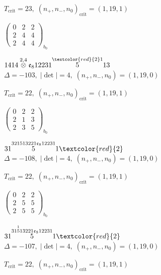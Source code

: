 \documentclass[10pt]{article}
\begin{document}
\hspace{1em}$T_{\text{crit}}=23,\; (n_+,n_-,n_0)_{\text{crit}}=(1,19,1)$

\hspace{2em}$\left(\begin{smallmatrix}0 & 2 & 2 \\ 2 & 4 & 4 \\ 2 & 4 & 4\end{smallmatrix}\right)_{\!b_0}$

\smallskip

$1414\overset{2,4}{\otimes}\mathfrak{e}_812231\overset{\textcolor{red}{2}1}{5}13$ \quad $\Delta=-103,\; |\det|=4,\; (n_+,n_-,n_0)=(1,19,0)$

\hspace{1em}$T_{\text{crit}}=22,\; (n_+,n_-,n_0)_{\text{crit}}=(1,19,1)$

\hspace{2em}$\left(\begin{smallmatrix}0 & 2 & 2 \\ 2 & 1 & 3 \\ 2 & 3 & 5\end{smallmatrix}\right)_{\!b_0}$

\smallskip

$31\overset{321513221\mathfrak{e}_812231}{5}1\textcolor{red}{2}$ \quad $\Delta=-108,\; |\det|=4,\; (n_+,n_-,n_0)=(1,19,0)$

\hspace{1em}$T_{\text{crit}}=22,\; (n_+,n_-,n_0)_{\text{crit}}=(1,19,1)$

\hspace{2em}$\left(\begin{smallmatrix}0 & 2 & 2 \\ 2 & 5 & 5 \\ 2 & 5 & 5\end{smallmatrix}\right)_{\!b_0}$

\smallskip

$31\overset{31\overset{1}{5}13221\mathfrak{e}_812231}{5}1\textcolor{red}{2}$ \quad $\Delta=-107,\; |\det|=4,\; (n_+,n_-,n_0)=(1,19,0)$

\hspace{1em}$T_{\text{crit}}=22,\; (n_+,n_-,n_0)_{\text{crit}}=(1,19,1)$
\end{document}
